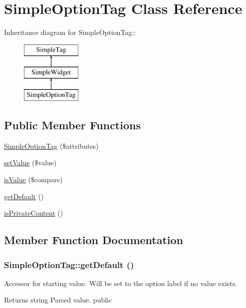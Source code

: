 \hypertarget{class_simple_option_tag}{
\section{SimpleOptionTag Class Reference}
\label{class_simple_option_tag}
}
Inheritance diagram for SimpleOptionTag::\begin{figure}[H]
\begin{center}
\leavevmode
\includegraphics[height=3cm]{class_simple_option_tag}
\end{center}
\end{figure}
\subsection*{Public Member Functions}
\begin{DoxyCompactItemize}
\item 
\hyperlink{class_simple_option_tag_aca0401931c341219b640106907c9d1a9}{SimpleOptionTag} (\$attributes)
\item 
\hyperlink{class_simple_option_tag_ab8296c8c864cb50ab4e43fe58caa3576}{setValue} (\$value)
\item 
\hyperlink{class_simple_option_tag_a616ac658cde8ca47c8f74b7baf21310c}{isValue} (\$compare)
\item 
\hyperlink{class_simple_option_tag_a2dd51cf14536d7f852f2976fa8bc96c4}{getDefault} ()
\item 
\hyperlink{class_simple_option_tag_a94df0c09858c39d2a3e486e70bdbfcfa}{isPrivateContent} ()
\end{DoxyCompactItemize}


\subsection{Member Function Documentation}
\hypertarget{class_simple_option_tag_a2dd51cf14536d7f852f2976fa8bc96c4}{
\subsubsection[{getDefault}]{\setlength{\rightskip}{0pt plus 5cm}SimpleOptionTag::getDefault ()}}
\label{class_simple_option_tag_a2dd51cf14536d7f852f2976fa8bc96c4}
Accessor for starting value. Will be set to the option label if no value exists. \begin{DoxyReturn}{Returns}
string Parsed value.  public 
\end{DoxyReturn}


